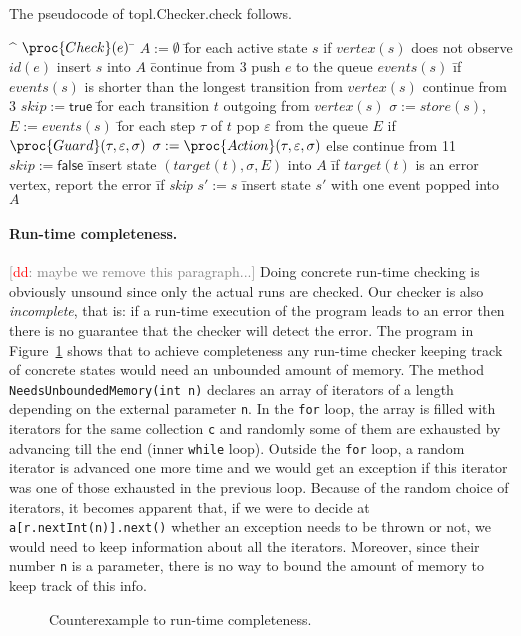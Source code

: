 \documentclass{sigplanconf}[10pt] %
\newcommand{\noterg}[2]{\textcolor{gray}{[\textcolor{red}{#1}: #2]}}
\newcommand{\dd}[1]{\noterg{dd}{#1}}
\newcommand{\dinocomment}[1]{\dd{#1}}
\begin{document}
The pseudocode of \textsf{topl.Checker.check} follows.

\begin{alg}
\^  $\proc{Check}(e)$
\=  $A := \emptyset$
\=  for each active state $s$
\+    if $\mathit{vertex}(s)$ does not observe $\mathit{id}(e)$
\+      insert $s$ into $A$
\=      continue from $3$
\-    push $e$ to the queue $\mathit{events}(s)$
\=    if $\mathit{events}(s)$ is shorter than the longest transition from $\mathit{vertex}(s)$
\+      continue from $3$
\1    $\mathit{skip}:=\mathsf{true}$
\=    for each transition $t$ outgoing from $\mathit{vertex}(s)$
\+      $\sigma := \mathit{store}(s)$,\quad $E := \mathit{events}(s)$
\=      for each step $\tau$ of $t$
\+        pop $\varepsilon$ from the queue $E$
\+        if $\proc{Guard}(\tau, \varepsilon, \sigma)$
\+          $\sigma := \proc{Action}(\tau, \varepsilon, \sigma)$
\-        else
\+          continue from 11
\2      $\mathit{skip}:=\mathsf{false}$
\=      insert state $(\mathit{target}(t), \sigma, E)$ into $A$
\=      if $\mathit{target}(t)$ is an error vertex, report the error
\=      if \textit{skip}
\+        $s' := s$
\=        insert state $s'$ with one event popped into $A$
\end{alg}



\paragraph{Run-time completeness.}
\dinocomment{maybe we remove this paragraph...}
Doing concrete run-time checking is obviously unsound since only the actual runs are checked.
Our checker is also {\em incomplete}, that is:
if a run-time execution of the program leads to an error then there is no guarantee that the checker will detect the error.
The program in Figure~\ref{fig:completeness} shows that to achieve completeness any run-time checker keeping track of concrete states would need an unbounded amount of memory.
The method {\tt NeedsUnboundedMemory(int n)}
declares an array of iterators of a length depending on the external parameter {\tt n}.
 In the {\tt for} loop, the array is filled with iterators for the same collection {\tt c} and randomly some of them are exhausted by advancing till the end (inner {\tt while} loop).
Outside the {\tt for} loop, a random iterator is advanced one more time and we would get an exception if this iterator was one of those exhausted in the previous loop.
Because of the random choice of iterators, it becomes apparent that, if we were to decide at {\tt a[r.nextInt(n)].next()} whether an exception needs to be thrown or not, we would need to keep information about all the iterators.
Moreover, since their number {\tt n} is a parameter, there is no way to bound the amount of memory to keep track of this info.
\begin{figure}[htbp]
\begin{center}

\caption{Counterexample to run-time completeness.}
\label{fig:completeness}
\end{center}
\end{figure}
\end{document}
